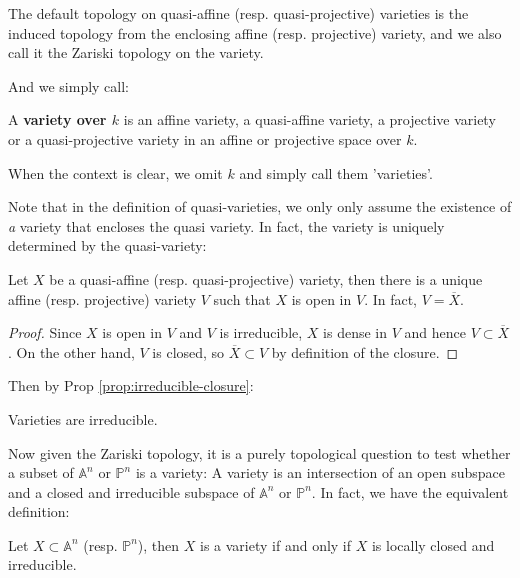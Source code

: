\documentclass{note-eng}
\begin{document}
The default topology on quasi-affine (resp. quasi-projective) varieties is the induced topology from the enclosing affine (resp. projective) variety, and we also call it the Zariski topology on the variety.

And we simply call:

\begin{definition}[Variety]
    A \textbf{variety over $k$} is an affine variety, a quasi-affine variety, a projective variety or a quasi-projective variety in an affine or projective space over $k$.
\end{definition}

When the context is clear, we omit $k$ and simply call them 'varieties'.

Note that in the definition of quasi-varieties, we only only assume the existence of \textit{a} variety that encloses the quasi variety. In fact, the variety is uniquely determined by the quasi-variety:

\begin{proposition} \label{prop:unique-enclosing-variety}
    Let $X$ be a quasi-affine (resp. quasi-projective) variety, then there is a unique affine (resp. projective) variety $V$ such that $X$ is open in $V$. In fact, $V = \overline{X}$.
\end{proposition}

\begin{proof}
    Since $X$ is open in $V$ and $V$ is irreducible, $X$ is dense in $V$ and hence $V \subset \overline{X}$. On the other hand, $V$ is closed, so $\overline{X} \subset V$ by definition of the closure.
\end{proof}

Then by Prop \ref{prop:irreducible-closure}:

\begin{proposition}\label{prop:variety-irred}
    Varieties are irreducible.
\end{proposition}

Now given the Zariski topology, it is a purely topological question to test whether a subset of $\mathbb{A}^n$ or $\mathbb{P}^n$ is a variety: A variety is an intersection of an open subspace and a closed and irreducible subspace of $\mathbb{A}^n$ or $\mathbb{P}^n$. In fact, we have the equivalent definition:

\begin{proposition}
    Let $X \subset \mathbb{A}^n$ (resp. $\mathbb{P}^n$), then $X$ is a variety if and only if $X$ is locally closed and irreducible.
\end{proposition}
\end{document}
